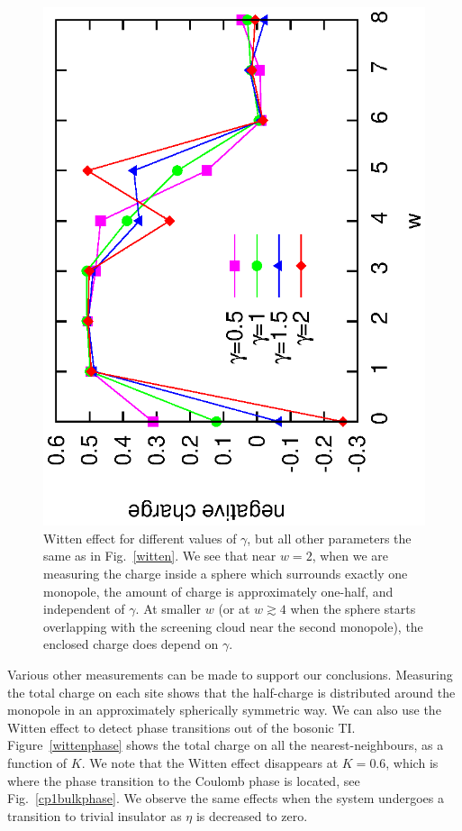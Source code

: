 \documentclass[prb,twocolumn]{revtex4-1}
\newcommand{\scripty}[1]{w}
\begin{document}
\begin{figure}
\includegraphics[angle=-90,width=\linewidth]{figures/wittendiff.eps}
\caption{Witten effect for different values of $\gamma$, but all other parameters the same as in Fig.~\ref{witten}. We see that near $\scripty{r}=2$, when we are measuring the charge inside a sphere which surrounds exactly one monopole, the amount of charge is approximately one-half, and independent of $\gamma$. At smaller $\scripty{r}$ (or at $\scripty{r} \gtrsim 4$ when the sphere starts overlapping with the screening cloud near the second monopole), the enclosed charge does depend on $\gamma$.}
\label{diffgamma}
\end{figure}

Various other measurements can be made to support our conclusions. Measuring the total charge on each site shows that the half-charge is distributed around the monopole in an approximately spherically symmetric way. We can also use the Witten effect to detect phase transitions out of the bosonic TI. Figure~\ref{wittenphase} shows the total charge on all the nearest-neighbours, as a function of $K$. We note that the Witten effect disappears at $K=0.6$, which is where the phase transition to the Coulomb phase is located, see Fig.~\ref{cp1bulkphase}. We observe the same effects when the system undergoes a transition to trivial insulator as $\eta$ is decreased to zero.
\end{document}
